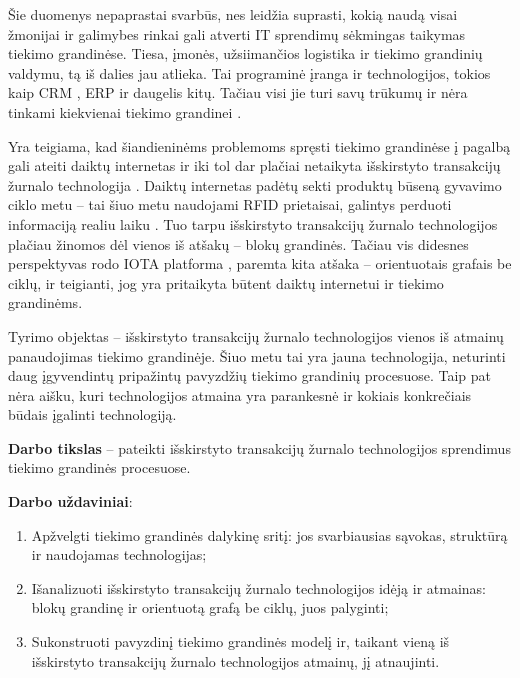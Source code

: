 Šie duomenys nepaprastai svarbūs, nes leidžia suprasti, kokią naudą visai žmonijai ir galimybes rinkai gali atverti IT sprendimų sėkmingas taikymas tiekimo grandinėse. Tiesa, įmonės, užsiimančios logistika ir tiekimo grandinių valdymu, tą iš dalies jau atlieka. Tai programinė įranga ir technologijos, tokios kaip CRM \cite{bharati2015current}, ERP \cite{neubert2018collaboration} ir daugelis kitų. Tačiau visi jie turi savų trūkumų ir nėra tinkami kiekvienai tiekimo grandinei \cite{garg2018supply}.

Yra teigiama, kad šiandieninėms problemoms spręsti tiekimo grandinėse į pagalbą gali ateiti daiktų internetas \cite{dweekat2017supply} ir iki tol dar plačiai netaikyta išskirstyto transakcijų žurnalo technologija \cite{abeyratne2016blockchain}. Daiktų internetas padėtų sekti produktų būseną gyvavimo ciklo metu – tai šiuo metu naudojami RFID prietaisai, galintys perduoti informaciją realiu laiku \cite{majeed2017internet}. Tuo tarpu išskirstyto transakcijų žurnalo technologijos plačiau žinomos dėl vienos iš atšakų – blokų grandinės. Tačiau vis didesnes perspektyvas rodo IOTA platforma \cite{popov2016tangle}, paremta kita atšaka – orientuotais grafais be ciklų, ir teigianti, jog yra pritaikyta būtent daiktų internetui ir tiekimo grandinėms. 

Tyrimo objektas – išskirstyto transakcijų žurnalo technologijos vienos iš atmainų panaudojimas tiekimo grandinėje. Šiuo metu tai yra jauna technologija, neturinti daug įgyvendintų pripažintų pavyzdžių tiekimo grandinių procesuose. Taip pat nėra aišku, kuri technologijos atmaina yra parankesnė ir kokiais konkrečiais būdais įgalinti technologiją.

\textbf{Darbo tikslas} – pateikti išskirstyto transakcijų žurnalo technologijos sprendimus tiekimo grandinės procesuose. 

\textbf{Darbo uždaviniai}:
\begin{enumerate}
    \item Apžvelgti tiekimo grandinės dalykinę sritį: jos svarbiausias sąvokas, struktūrą ir naudojamas technologijas;
    \item Išanalizuoti išskirstyto transakcijų žurnalo technologijos idėją ir atmainas: blokų grandinę ir orientuotą grafą be ciklų, juos palyginti;
    \item Sukonstruoti pavyzdinį tiekimo grandinės modelį ir, taikant vieną iš išskirstyto transakcijų žurnalo technologijos atmainų, jį atnaujinti.
\end{enumerate}



